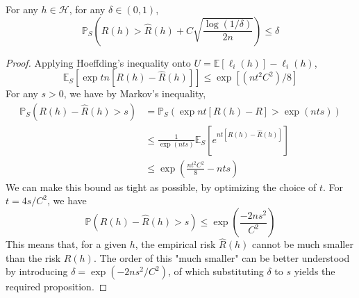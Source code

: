 \begin{proposition}\label{prop:PAC_ERM_1}
    For any $h\in\mathcal{H}$, for any $\delta\in(0,1)$, 
    \begin{equation}
        \mathbb{P}_{S}\left( R(h) > \hat{R}(h)+ C\sqrt{\frac{\log{(1/\delta)}}{2n}}\right)\leq \delta
    \end{equation}
\end{proposition}
\begin{proof}
    Applying Hoeffding's inequality onto $U=\mathbb{E}[\ell_{i}(h)]-\ell_{i}(h)$, 
    \begin{equation}
        \mathbb{E}_{S}\left[\exp{tn[R(h)-\hat{R}(h)]}\right] \leq \exp{[(nt^2C^2)/8]}
    \end{equation}
    For any $s>0$, we have by Markov's inequality, 
    \begin{equation}
        \begin{split}
            \mathbb{P}_{S}(R(h)-\hat{R}(h)>s) 
            & = \mathbb{P}_{S} \left(\exp{nt[R(h)-R]}> \exp{(nts)}\right)\\
            & \leq \frac{1}{\exp{(nts)}} \mathbb{E}_{S}\left[e^{nt[R(h)-\hat{R}(h)]}\right]\\
            & \leq \exp{\left(\frac{nt^2C^2}{8}-nts\right)}
            \end{split}
    \end{equation}
    We can make this bound as tight as possible, by optimizing the choice of $t$. For $t=4s/C^{2}$, we have 
    \begin{equation}
        \mathbb{P}(R(h)-\hat{R}(h)>s) \leq \exp{\left(\frac{-2ns^2}{C^2}\right)}
    \end{equation}
    This means that, for a given $h$, the empirical risk $\hat{R}(h)$ cannot be much smaller than the risk $R(h)$. The order of this "much smaller" can be better understood by introducing $\delta=\exp{(-2ns^2/C^2)}$, of which substituting $\delta$ to $s$ yields the required proposition. 
\end{proof}

